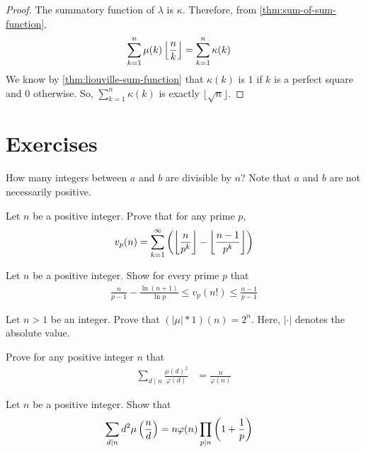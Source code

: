 	\begin{proof}
		The summatory function of $\lambda$ is $\kappa$. Therefore, from \autoref{thm:sum-of-sum-function},
			\begin{align*}
				\sum_{k=1}^{n} \mu(k)\left\lfloor{\frac{n}{k}}\right\rfloor &= \sum_{k=1}^{n} \kappa(k)
			\end{align*}
		We know by \autoref{thm:liouville-sum-function} that $\kappa(k)$ is $1$ if $k$ is a perfect square and $0$ otherwise. So, $\sum\limits_{k=1}^{n} \kappa(k)$ is exactly $\lfloor \sqrt n \rfloor$.
	\end{proof}
\newpage
\section{Exercises}

\begin{problem}
	How many integers between $a$ and $b$ are divisible by $n$? Note that $a$ and $b$ are not necessarily positive.
\end{problem}

\begin{problem}
	Let $n$ be a positive integer. Prove that for any prime $p$,
		\begin{align*}
			v_p(n)= \sum_{k=1}^{\infty}\left(\left\lfloor{\frac{n}{p^k}}\right\rfloor- \left\lfloor{\frac{n-1}{p^k}}\right\rfloor\right)
		\end{align*}
\end{problem}

\begin{problem}%
	Let $n$ be a positive integer. Show for every prime $p$ that
		\begin{align*}
			\frac{n}{p-1} - \frac{\ln(n+1)}{\ln p} \leq v_p(n!) \leq \frac{n-1}{p-1}
		\end{align*}
\end{problem}

\begin{problem}
	Let $n>1$ be an integer. Prove that $(|\mu|\ast 1)(n)=2^n$. Here, $|\cdot|$ denotes the absolute value.
\end{problem}

\begin{problem}
	Prove for any positive integer $n$ that
		\begin{align*}
			\sum_{d\mid n} \frac{\mu(d)^2}{\varphi(d)}
				& = \frac{n}{\varphi(n)}
		\end{align*}
\end{problem}

\begin{problem}
	Let $n$ be a positive integer. Show that
		\begin{align*}
			\sum_{d\mid n} d^2\mu\left(\frac{n}{d}\right)
				& = n \varphi(n) \prod_{p\mid n}\left(1+ \frac{1}{p}\right)
		\end{align*}
\end{problem}

